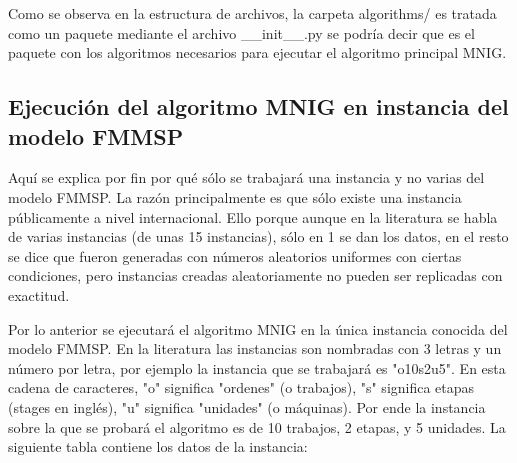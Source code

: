 \documentclass{article}
\begin{document}
\vspace{\baselineskip}
Como se observa en la estructura de archivos, la carpeta algorithms/ es tratada como un paquete mediante el archivo \_\_init\_\_.py se podría decir que es el paquete con los algoritmos necesarios para ejecutar el algoritmo principal MNIG.

\subsection{Ejecución del algoritmo MNIG en instancia del modelo FMMSP}

Aquí se explica por fin por qué sólo se trabajará una instancia y no varias del modelo FMMSP. La razón principalmente es que sólo existe una instancia públicamente a nivel internacional. Ello porque aunque en la literatura se habla de varias instancias (de unas 15 instancias), sólo en 1 se dan los datos, en el resto se dice que fueron generadas con números aleatorios uniformes con ciertas condiciones, pero instancias creadas aleatoriamente no pueden ser replicadas con exactitud. \autocite{modFMMSP}

\vspace{\baselineskip}
Por lo anterior se ejecutará el algoritmo MNIG en la única instancia conocida del modelo FMMSP. En la literatura las instancias son nombradas con 3 letras y un número por letra, por ejemplo la instancia que se trabajará es "o10s2u5". En esta cadena de caracteres, "o" significa "ordenes" (o trabajos), "s" significa etapas (stages en inglés), "u" significa "unidades" (o máquinas). Por ende la instancia sobre la que se probará el algoritmo es de 10 trabajos, 2 etapas, y 5 unidades. La siguiente tabla contiene los datos de la instancia: \autocite{modFMMSP}
\end{document}
